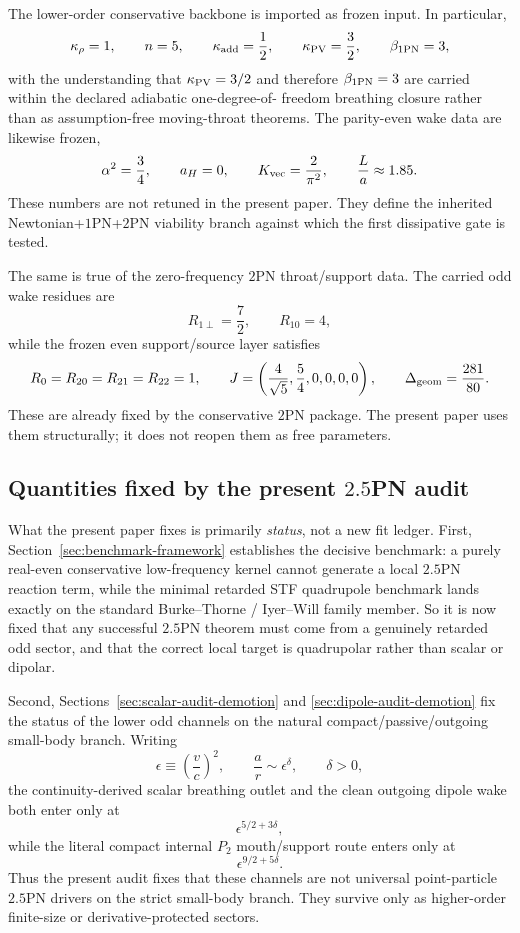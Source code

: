 \documentclass[11pt]{article}
\begin{document}
The lower-order conservative backbone is imported as frozen input.  In
particular,
\[
\kappa_\rho = 1,
\qquad
n = 5,
\qquad
\kappa_{\rm add}=\frac12,
\qquad
\kappa_{\rm PV}=\frac32,
\qquad
\beta_{1\rm PN}=3,
\]
with the understanding that $\kappa_{\rm PV}=3/2$ and therefore
$\beta_{1\rm PN}=3$ are carried within the declared adiabatic one-degree-of-
freedom breathing closure rather than as assumption-free moving-throat theorems.
The parity-even wake data are likewise frozen,
\[
\alpha^2=\frac34,
\qquad
a_H=0,
\qquad
K_{\rm vec}=\frac{2}{\pi^2},
\qquad
\frac{L}{a}\approx 1.85.
\]
These numbers are not retuned in the present paper.  They define the inherited
Newtonian+$1$PN+$2$PN viability branch against which the first dissipative gate
is tested.

The same is true of the zero-frequency $2$PN throat/support data.  The carried
odd wake residues are
\[
R_{1\perp}=\frac72,
\qquad
R_{10}=4,
\]
while the frozen even support/source layer satisfies
\[
R_0=R_{20}=R_{21}=R_{22}=1,
\qquad
J=\left(\frac{4}{\sqrt5},\frac54,0,0,0,0\right),
\qquad
\Delta_{\rm geom}=\frac{281}{80}.
\]
These are already fixed by the conservative $2$PN package.  The present paper
uses them structurally; it does not reopen them as free parameters.

\subsection{Quantities fixed by the present \texorpdfstring{$2.5$}{2.5}PN audit}
\label{sec:fixed-vs-symbolic-present}

What the present paper fixes is primarily \emph{status}, not a new fit ledger.
First, Section~\ref{sec:benchmark-framework} establishes the decisive benchmark:
a purely real-even conservative low-frequency kernel cannot generate a local
$2.5$PN reaction term, while the minimal retarded STF quadrupole benchmark lands
exactly on the standard Burke--Thorne / Iyer--Will family member.  So it is now
fixed that any successful $2.5$PN theorem must come from a genuinely retarded
odd sector, and that the correct local target is quadrupolar rather than scalar
or dipolar.

Second, Sections~\ref{sec:scalar-audit-demotion} and
\ref{sec:dipole-audit-demotion} fix the status of the lower odd channels on the
natural compact/passive/outgoing small-body branch.  Writing
\[
\epsilon\equiv \left(\frac{v}{c}\right)^2,
\qquad
\frac{a}{r}\sim \epsilon^\delta,
\qquad \delta>0,
\]
the continuity-derived scalar breathing outlet and the clean outgoing dipole wake
both enter only at
\[
\epsilon^{5/2+3\delta},
\]
while the literal compact internal $P_2$ mouth/support route enters only at
\[
\epsilon^{9/2+5\delta}.
\]
Thus the present audit fixes that these channels are not universal point-particle
$2.5$PN drivers on the strict small-body branch.  They survive only as
higher-order finite-size or derivative-protected sectors.
\end{document}
